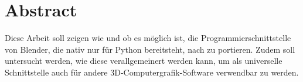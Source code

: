 \section*{Abstract}

Diese Arbeit soll zeigen wie und ob es möglich ist, die Programmierschnittstelle von Blender, die nativ nur für Python bereitsteht, nach \CS zu portieren. Zudem soll untersucht werden, wie diese verallgemeinert werden kann, um als universelle Schnittstelle auch für andere 3D-Computergrafik-Software verwendbar zu werden.
